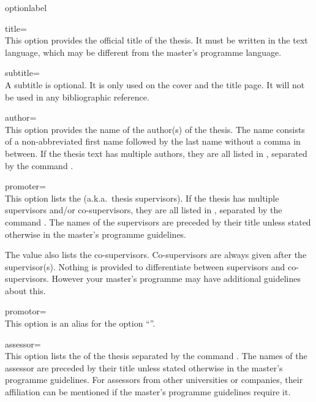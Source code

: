\begin{labelled}{optionlabel}
\item[title=\meta{title}]\\
  This option provides the official title  of the thesis. It
  must be written in the text language, which may be different from the
  master's programme language.

\item[subtitle=\meta{stitle}]\\
  A subtitle  is optional. It is only used on the cover and
  the title page. It will not be used in any bibliographic reference.

\item[author=\meta{authors}]
  \label{opt:author}\\
  This option provides the name  of the author(s) of the
  thesis. The name consists of a non-abbreviated first name followed by the
  last name without a comma in between. If the thesis text has multiple
  authors, they are all listed in , separated by the command
  .

\item[promoter=\meta{promoters}]
  \\
  This option lists the  (a.k.a.\ thesis supervisors). If
  the thesis has multiple supervisors and/or co-supervisors, they are all
  listed in , separated by the command . The names of
  the supervisors are preceded by their title unless stated otherwise in
  the master's programme guidelines.

  The  value also lists the co-supervisors. Co-supervisors are
  always given after the supervisor(s). Nothing is provided to differentiate
  between supervisors and co-supervisors. However your master's programme may
  have additional guidelines about this.

\item[promotor=\meta{promoters}]\mbox{}\\
  This option is an alias for the option ``''.

\item[assessor=\meta{assessors}]
  \\
  This option lists the  of the thesis separated by the command
  . The names of the assessor are preceded by their title unless
  stated otherwise in the master's programme guidelines. For assessors from
  other universities or companies, their affiliation can be mentioned if the
  master's programme guidelines require it.


\end{labelled}
